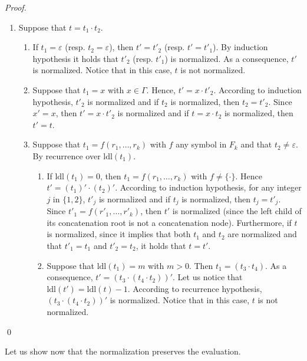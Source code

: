 \documentclass[a4paper]{llncs}
\begin{document}
\begin{proof}
\begin{enumerate}
      \item Suppose that $t=t_1\cdot t_2$. 
\begin{enumerate}
        \item If $t_1=\varepsilon$ (resp. $t_2=\varepsilon$), then $t'=t'_2$ (resp. $t'=t'_1$). By induction hypothesis it holds that $t'_2$ (resp. $t'_1$) is normalized. As a consequence, $t'$ is normalized. Notice that in this case, $t$ is not normalized.
\item Suppose that $t_1=x$ with $x\in\Gamma$. Hence, $t'=x\cdot t'_2$. According to induction hypothesis, $t'_2$ is normalized and if $t_2$ is normalized, then $t_2=t'_2$. Since $x'=x$, then $t'=x\cdot t'_2$ is normalized and if $t=x\cdot t_2$ is normalized, then $t'=t$.
\item Suppose that $t_1=f(r_1,\ldots,r_k)$ with $f$ any symbol in $F_k$ and that $t_2\neq\varepsilon$. By recurrence over $\mathrm{ldl}(t_1)$. 
        \begin{enumerate}
          \item If $\mathrm{ldl}(t_1)=0$, then $t_1=f(r_1,\ldots,r_k)$ with $f\neq\{\cdot\}$. Hence $t'=(t_1)'\cdot(t_2)'$. According to induction hypothesis, for any integer $j$ in $\{1,2\}$, $t'_j$ is normalized and if $t_j$ is normalized, then $t_j=t'_j$. Since $t'_1=f(r'_1,\ldots,r'_k)$, then $t'$ is normalized (since the left child of its concatenation root is not a concatenation node). Furthermore, if $t$ is normalized, since it implies that both $t_1$ and $t_2$ are normalized and that $t'_1=t_1$ and $t'_2=t_2$, it holds that $t=t'$. 
          \item Suppose that $\mathrm{ldl}(t_1)=m$ with $m>0$. Then $t_1=(t_3\cdot t_4)$. As a consequence, $t'=(t_3\cdot(t_4\cdot t_2))'$. Let us notice that $\mathrm{ldl}(t')=\mathrm{ldl}(t)-1$. According to recurrence hypothesis, $(t_3\cdot(t_4\cdot t_2))'$ is normalized. Notice that in this case, $t$ is not normalized.
        \end{enumerate}
      \end{enumerate}
    \end{enumerate}
    \qed
  \end{proof}
  
  Let us show now that the normalization preserves the evaluation.
  
\end{document}
